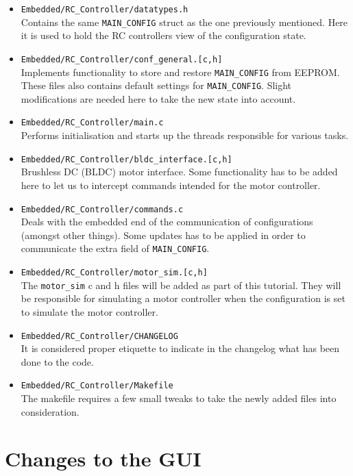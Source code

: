 \documentclass[12pt]{article} %
\begin{document}
\begin{itemize}
\item {\verb!Embedded/RC_Controller/datatypes.h!}  \\ Contains the
  same {\verb!MAIN_CONFIG!} struct as the one previously mentioned.
  Here it is used to hold the RC controllers view of the configuration
  state.
\item {\verb!Embedded/RC_Controller/conf_general.[c,h]!} \\ Implements
  functionality to store and restore {\verb!MAIN_CONFIG!} from
  EEPROM. These files also contains default settings for
  {\verb!MAIN_CONFIG!}.  Slight modifications are needed here to take
  the new state into account.
\item {\verb!Embedded/RC_Controller/main.c!} \\
  Performs initialisation and starts up the threads responsible for
  various tasks. 
\item {\verb!Embedded/RC_Controller/bldc_interface.[c,h]!}
  \\ Brushless DC (BLDC) motor interface. Some functionality has to be
  added here to let us to intercept commands intended for the motor
  controller.
\item {\verb!Embedded/RC_Controller/commands.c!} \\ Deals with the
  embedded end of the communication of configurations (amongst other
  things). Some updates has to be applied in order to communicate the
  extra field of {\verb!MAIN_CONFIG!}.

\item {\verb!Embedded/RC_Controller/motor_sim.[c,h]!} \\ The
  \verb!motor_sim! c and h files will be added as part of this
  tutorial. They will be responsible for simulating a motor controller
  when the configuration is set to simulate the motor controller.
\item {\verb!Embedded/RC_Controller/CHANGELOG!} \\ It is considered
  proper etiquette to indicate in the changelog what has been done to
  the code.
  
\item {\verb!Embedded/RC_Controller/Makefile!} \\
  The makefile requires a few small tweaks to take the newly added files
  into consideration.
\end{itemize}



\section{Changes to the GUI}
\end{document}
